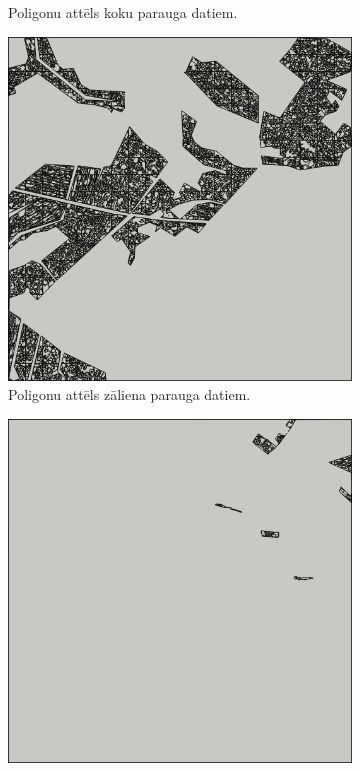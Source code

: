 \documentclass[12pt,paper=a4]{report}
\begin{document}
\begin{figure}[h!]
\begin{subfigure}[b]{.3\linewidth}
\caption{Poligonu attēls koku parauga datiem.}
\label{fig:kokiPoly}
\end{subfigure}
\begin{subfigure}[b]{.3\linewidth}
\includegraphics[width=\linewidth]{zaliensPolygons}
\caption{Poligonu attēls zāliena parauga datiem.}\label{fig:zaliensPoly}
\end{subfigure}
\begin{subfigure}[b]{.3\linewidth}
\includegraphics[width=\linewidth]{lauksPolygons}

\end{subfigure}
\end{figure}
\end{document}
